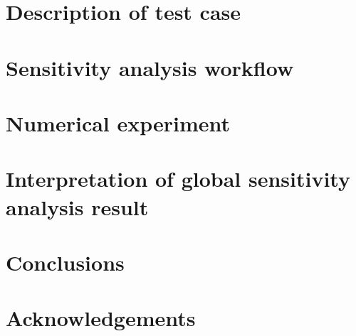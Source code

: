 \documentclass[review]{elsarticle}
\numberwithin{equation}{section}
\numberwithin{equation}{section}
\begin{document}
\section{Description of test case}
\section{Sensitivity analysis workflow}
\section{Numerical experiment}
\section{Interpretation of global sensitivity analysis result}
\section{Conclusions}
\section*{Acknowledgements}
\end{document}
